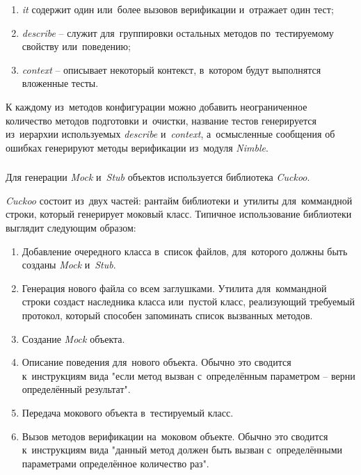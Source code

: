 \begin{enumerate}
	\item \textit{it} содержит один или~более вызовов верификации и~отражает один тест;
	\item \textit{describe} -- служит для~группировки остальных методов по~тестируемому свойству или~поведению;
	\item \textit{context} -- описывает некоторый контекст, в~котором будут выполнятся вложенные тесты.
\end{enumerate}

К каждому из~методов конфигурации можно добавить неограниченное количество методов подготовки и~очистки, название тестов генерируется из~иерархии используемых \textit{describe} и~\textit{context}, а~осмысленные сообщения об ошибках генерируют методы верификации из~модуля \textit{Nimble}.

\subsubsection{}
\label{sec:testing:tech:cuckoo}
Для генерации \textit{Mock} и~\textit{Stub} объектов используется библиотека \textit{Cuckoo}.

\textit{Cuckoo} состоит из~двух частей: рантайм библиотеки и~утилиты для~коммандной строки, который генерирует моковый класс. Типичное использование библиотеки выглядит следующим образом:

\begin{enumerate}
	\item Добавление очередного класса в~список файлов, для~которого должны быть созданы \textit{Mock} и~\textit{Stub}.
	\item Генерация нового файла со всем заглушками. Утилита для~коммандной строки создаст наследника класса или~пустой класс, реализующий требуемый протокол, который способен запоминать список вызванных методов.
	\item Создание \textit{Mock} объекта.
	\item Описание поведения для~нового объекта. Обычно это сводится к~инструкциям вида "если метод вызван с~определённым параметром -- верни определённый результат".
	\item Передача мокового объекта в~тестируемый класс.
	\item Вызов методов верификации на~моковом объекте. Обычно это сводится к~инструкциям вида "данный метод должен быть вызван с~определёнными параметрами определённое количество раз".
\end{enumerate}